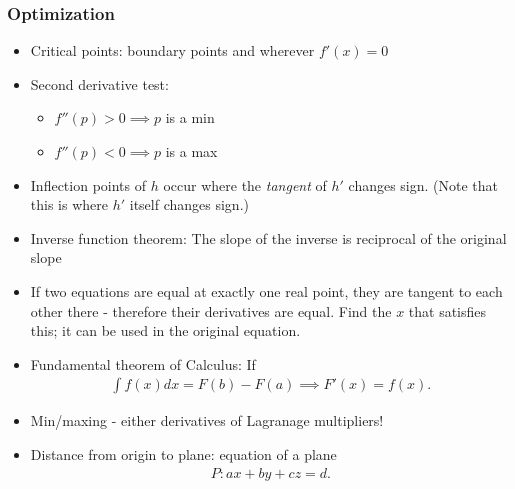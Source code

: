 \hypertarget{optimization}{%
\subsubsection{Optimization}\label{optimization}}

\begin{itemize}
\item
  Critical points: boundary points and wherever \(f'(x) = 0\)
\item
  Second derivative test:

  \begin{itemize}
  \tightlist
  \item
    \(f''(p) > 0 \implies p\) is a min
  \item
    \(f''(p) < 0 \implies p\) is a max
  \end{itemize}
\item
  Inflection points of \(h\) occur where the \emph{tangent} of \(h'\)
  changes sign. (Note that this is where \(h'\) itself changes sign.)
\item
  Inverse function theorem: The slope of the inverse is reciprocal of
  the original slope
\item
  If two equations are equal at exactly one real point, they are tangent
  to each other there - therefore their derivatives are equal. Find the
  \(x\) that satisfies this; it can be used in the original equation.
\item
  Fundamental theorem of Calculus: If
  \begin{align*}  
  \int f(x) dx = F(b) - F(a) \implies F'(x) = f(x)
  .\end{align*}
\item
  Min/maxing - either derivatives of Lagranage multipliers!
\item
  Distance from origin to plane: equation of a plane
  \begin{align*}  
  P: ax+by+cz=d
  .\end{align*}


\end{itemize}
